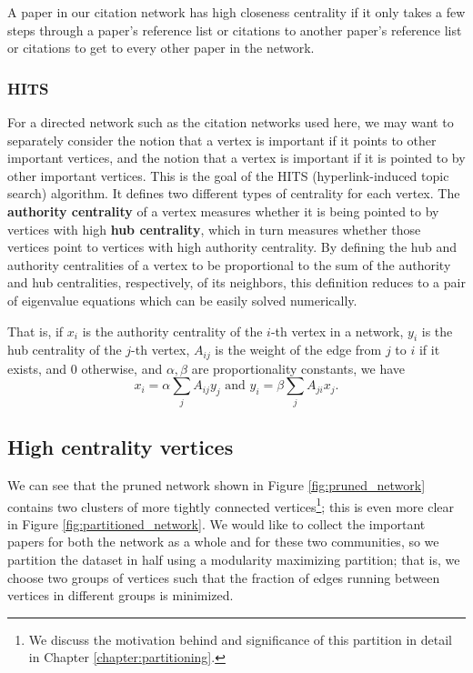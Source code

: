\documentclass[12pt]{thesis}
\theoremstyle{plain}
\theoremstyle{definition}
\theoremstyle{remark}
\begin{document}
A paper in our citation network has high closeness centrality if it only takes a few steps through a paper's reference list or citations to another paper's reference list or citations to get to every other paper in the network. 

\subsubsection{HITS}
For a directed network such as the citation networks used here, we may want to separately consider the notion that a vertex is important if it points to other important vertices, and the notion that a vertex is important if it is pointed to by other important vertices. This is the goal of the HITS (hyperlink-induced topic search) algorithm. It defines two different types of centrality for each vertex. The \textbf{authority centrality} of a vertex measures whether it is being pointed to by vertices with high \textbf{hub centrality}, which in turn measures whether those vertices point to vertices with high authority centrality. By defining the hub and authority centralities of a vertex to be proportional to the sum of the authority and hub centralities, respectively, of its neighbors, this definition reduces to a pair of eigenvalue equations which can be easily solved numerically. 

That is, if $x_i$ is the authority centrality of the $i$-th vertex in a network, $y_i$ is the hub centrality of the $j$-th vertex, $A_{ij}$ is the weight of the edge from $j$ to $i$ if it exists, and 0 otherwise, and $\alpha, \beta$ are proportionality constants, we have
\[x_i = \alpha \sum_j A_{ij}y_j\text{ and } y_i = \beta \sum_j A_{ji}x_j.\]

\subsection{High centrality vertices}\label{section:high_centrality_vertices}

We can see that the pruned network shown in Figure \ref{fig:pruned_network} contains two clusters of more tightly connected vertices\footnote{We discuss the motivation behind and significance of this partition in detail in Chapter \ref{chapter:partitioning}.}; this is even more clear in Figure \ref{fig:partitioned_network}. We would like to collect the important papers for both the network as a whole and for these two communities, so we partition the dataset in half using a modularity maximizing partition; that is, we choose two groups of vertices such that the fraction of edges running between vertices in different groups is minimized.
\end{document}
